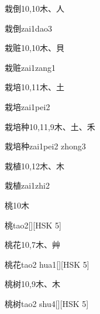 \begin{entry}{栽倒}{10,10}{⽊、⼈}
  \begin{phonetics}{栽倒}{zai1dao3}
  \end{phonetics}
\end{entry}

\begin{entry}{栽赃}{10,10}{⽊、⾙}
  \begin{phonetics}{栽赃}{zai1zang1}
  \end{phonetics}
\end{entry}

\begin{entry}{栽培}{10,11}{⽊、⼟}
  \begin{phonetics}{栽培}{zai1pei2}
  \end{phonetics}
\end{entry}

\begin{entry}{栽培种}{10,11,9}{⽊、⼟、⽲}
  \begin{phonetics}{栽培种}{zai1pei2 zhong3}
  \end{phonetics}
\end{entry}

\begin{entry}{栽植}{10,12}{⽊、⽊}
  \begin{phonetics}{栽植}{zai1zhi2}
  \end{phonetics}
\end{entry}

\begin{entry}{桃}{10}{⽊}
  \begin{phonetics}{桃}{tao2}[][HSK 5]
  \end{phonetics}
\end{entry}

\begin{entry}{桃花}{10,7}{⽊、⾋}
  \begin{phonetics}{桃花}{tao2 hua1}[][HSK 5]
  \end{phonetics}
\end{entry}

\begin{entry}{桃树}{10,9}{⽊、⽊}
  \begin{phonetics}{桃树}{tao2 shu4}[][HSK 5]
  \end{phonetics}
\end{entry}

